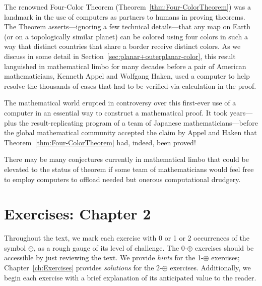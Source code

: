   
The renowned Four-Color Theorem (Theorem~\ref{thm:Four-ColorTheorem}) was a landmark in the use of computers as partners to humans in proving theorems.  The Theorem asserts---ignoring a few technical details---that any map on Earth (or on a topologically similar planet) can be colored using four colors in such a way that distinct countries that share a border receive distinct colors.  As we discuss in some detail in Section~\ref{sec:planar+outerplanar-color}, this result languished in mathematical limbo for many decades before a pair of American mathematicians, Kenneth Appel and Wolfgang Haken, used a computer to help resolve the thousands of cases that had to be verified-via-calculation in the proof.

The mathematical world erupted in controversy over this first-ever use of a computer in an essential way to construct a mathematical proof.  It took years---plus the result-replicating program of a team of Japanese mathematicians---before the global mathematical community accepted the claim by Appel and Haken that Theorem~\ref{thm:Four-ColorTheorem} had, indeed, been proved!

\medskip

There may be many conjectures currently in mathematical limbo that could be elevated to the status of theorem if some team of mathematicians would feel free to employ computers to offload needed but onerous computational drudgery.



\section{Exercises: Chapter 2}

Throughout the text, we mark each exercise with 0 or 1 or 2 occurrences of the symbol $\oplus$, as a rough gauge of its level of challenge.  The 0-$\oplus$ exercises should be accessible by just reviewing the text.  We provide {\em hints} for the 1-$\oplus$ exercises; Chapter~\ref{ch:Exercises} provides {\em solutions} for the 2-$\oplus$ exercises.  Additionally, we begin each exercise with a brief explanation of its anticipated value to the reader.

